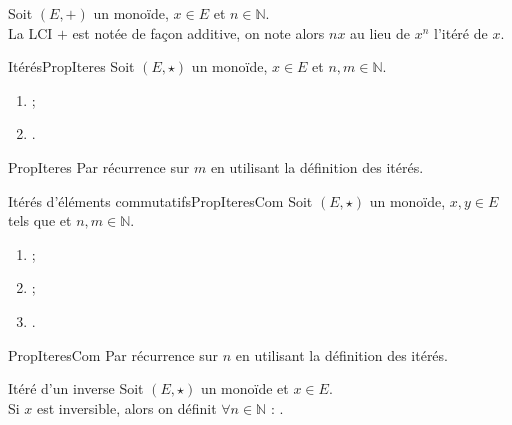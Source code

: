 \documentclass[12pt,a4paper]{report}
\begin{document}
    \begin{remarque}
    Soit $(E, +)$ un monoïde, $x \in E$ et $n \in \mathbb{N}$.\\
    La LCI $+$ est notée de façon additive, on note alors $nx$ au lieu de $x^n$ l'itéré de $x$.
    \end{remarque}
    
    \begin{propositions}{Itérés}{PropIteres}
    Soit $(E, \star)$ un monoïde, $x \in E$ et $n, m \in \mathbb{N}$.
    \begin{multicols}{2}
    \begin{enumerate}[label=\bfseries\arabic*)]
        \item {} ;
        \item {}.
    \end{enumerate}
    \end{multicols}
    \end{propositions}
    
    \begin{principedemo}{PropIteres}
    Par récurrence sur $m$ en utilisant la définition des itérés.
    \end{principedemo}

    \begin{propositions}{Itérés d'éléments commutatifs}{PropIteresCom}
    Soit $(E, \star)$ un monoïde, $x, y \in E$ tels que  et $n, m \in \mathbb{N}$.
    \begin{multicols}{3}
    \begin{enumerate}[label=\bfseries\arabic*)]
        \item {} ;
        \item {} ;
        \item {}.
    \end{enumerate}
    \end{multicols}
    \end{propositions}
    
    \begin{principedemo}{PropIteresCom}
    Par récurrence sur $n$ en utilisant la définition des itérés.
    \end{principedemo}
    
    \begin{definition}{Itéré d'un inverse}{}
    Soit $(E, \star)$ un monoïde et $x \in E$.\\
    Si $x$ est inversible, alors on définit $\forall n \in \mathbb{N}$ : .
    \end{definition}
    
\end{document}
